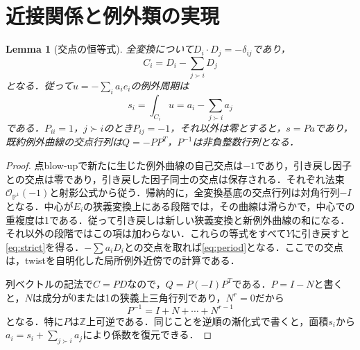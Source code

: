 \documentclass[12pt]{amsart}
\newtheorem{lem}[thm]{Lemma}
\theoremstyle{definition}
\theoremstyle{remark}
\numberwithin{equation}{section}
\newcommand{\cO}{\mathcal{O}}
\newcommand{\Z}{\mathbb{Z}}
\newcommand{\mP}{\mathbb{P}}
\begin{document}
\section{近接関係と例外類の実現}\label{sec:realization}
\begin{lem}[交点の恒等式]\label{lem:proximity}
全変換について$D_i\cdot D_j=-\delta_{ij}$であり，
\begin{equation}\label{eq:strict}
 C_i=D_i-\sum_{j\succ i}D_j
\end{equation}
となる．従って$u=-\sum_i a_i e_i$の例外周期は
\begin{equation}\label{eq:period}
 s_i=\int_{C_i}u=a_i-\sum_{j\succ i}a_j
\end{equation}
である．$P_{ii}=1$，$j\succ i$のとき$P_{ij}=-1$，それ以外は零とすると，$s=Pa$であり，既約例外曲線の交点行列は$Q=-PP^T$，$P^{-1}$は非負整数行列となる．
\end{lem}
\begin{proof}
点blow-upで新たに生じた例外曲線の自己交点は$-1$であり，引き戻し因子との交点は零であり，引き戻した因子同士の交点は保存される．それぞれ法束$\cO_{\mP^1}(-1)$と射影公式から従う．帰納的に，全変換基底の交点行列は対角行列$-I$となる．中心が$E_i$の狭義変換上にある段階では，その曲線は滑らかで，中心での重複度は1である．従って引き戻しは新しい狭義変換と新例外曲線の和になる．それ以外の段階ではこの項は加わらない．これらの等式をすべて$Y$に引き戻すと\eqref{eq:strict}を得る．$-\sum a_iD_i$との交点を取れば\eqref{eq:period}となる．ここでの交点は，twistを自明化した局所例外近傍での計算である．

列ベクトルの記法で$C=PD$なので，$Q=P(-I)P^T$である．$P=I-N$と書くと，$N$は成分が0または1の狭義上三角行列であり，$N^r=0$だから
\begin{equation}\label{eq:inverse}
 P^{-1}=I+N+\cdots+N^{r-1}
\end{equation}
となる．特に$P$は$\Z$上可逆である．同じことを逆順の漸化式で書くと，面積$s_i$から$a_i=s_i+\sum_{j\succ i}a_j$により係数を復元できる．
\end{proof}
\end{document}
